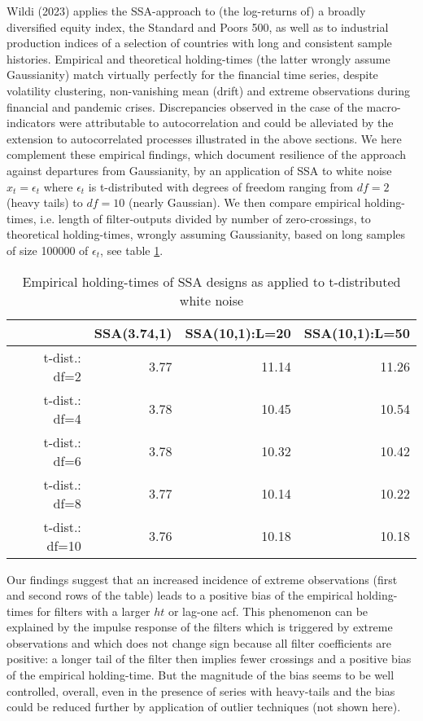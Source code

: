 \documentclass[a4paper]{article}
\begin{document}
Wildi (2023) applies the SSA-approach to (the log-returns of) a broadly diversified equity index, the Standard and Poors 500, as well as  to industrial production indices of a selection of countries with long and consistent sample histories. Empirical and theoretical holding-times (the latter wrongly assume Gaussianity) match virtually perfectly for the financial time series, despite volatility clustering, non-vanishing mean (drift) and extreme observations during financial and pandemic crises. Discrepancies observed in the case of the macro-indicators were attributable to autocorrelation and could be alleviated by the extension to autocorrelated processes illustrated in the above sections. 
We here complement these empirical findings, which document resilience of the approach against departures from Gaussianity, by an application of SSA to white noise $x_t=\epsilon_t$ where $\epsilon_t$ is t-distributed with degrees of freedom ranging from $df=2$ (heavy tails) to $df=10$ (nearly Gaussian). We then compare empirical holding-times, i.e. length of filter-outputs divided by number of zero-crossings, to theoretical holding-times, wrongly assuming Gaussianity, based on long samples of size 100000 of $\epsilon_t$, see table \ref{emp_ht}.
\begin{table}[ht]
\centering
\begin{tabular}{rrrr}
  \hline
 & SSA(3.74,1) & SSA(10,1):L=20 & SSA(10,1):L=50 \\ 
  \hline
t-dist.: df=2 & 3.77 & 11.14 & 11.26 \\ 
  t-dist.: df=4 & 3.78 & 10.45 & 10.54 \\ 
  t-dist.: df=6 & 3.78 & 10.32 & 10.42 \\ 
  t-dist.: df=8 & 3.77 & 10.14 & 10.22 \\ 
  t-dist.: df=10 & 3.76 & 10.18 & 10.18 \\ 
   \hline
\end{tabular}
\caption{Empirical holding-times of SSA designs as applied to t-distributed white noise} 
\label{emp_ht}
\end{table}Our findings suggest that an increased incidence of extreme observations (first and second rows of the table) leads to a positive bias of the empirical holding-times for filters with a larger $ht$ or lag-one acf. This phenomenon can be explained by the impulse response of the filters which is triggered by extreme observations and which does not change sign because all filter coefficients are positive: a longer  tail of the filter then implies fewer crossings and a positive bias of the empirical holding-time. But the magnitude of the bias seems to be well controlled, overall, even in the presence of series with heavy-tails and the bias could be reduced further by application of outlier techniques (not shown here).
\end{document}
